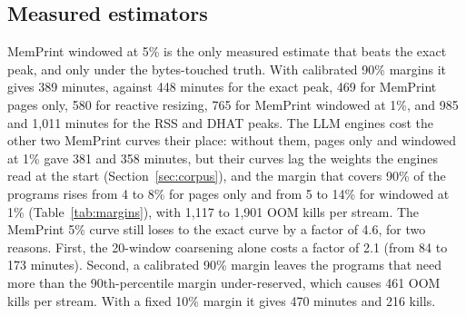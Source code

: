 \documentclass[11pt]{article}
\newcommand{\memprint}{MemPrint}
\newcommand{\secref}[1]{Section~\ref{#1}}
\newcommand{\tabref}[1]{Table~\ref{#1}}
\begin{document}
\subsection{Measured estimators}

\memprint{} windowed at 5\% is the only measured estimate that beats the exact peak, and only under the
bytes-touched truth. With calibrated 90\% margins it gives 389 minutes, against 448 minutes for the exact peak,
469 for \memprint{} pages only, 580 for reactive resizing, 765 for \memprint{} windowed at 1\%, and 985 and 1{,}011
minutes for the RSS and DHAT peaks. The LLM engines cost the other two \memprint{} curves their place: without
them, pages only and windowed at 1\% gave 381 and 358 minutes, but their curves lag the weights the engines read
at the start (\secref{sec:corpus}), and the margin that covers 90\% of the programs rises from 4 to 8\% for pages
only and from 5 to 14\% for windowed at 1\% (\tabref{tab:margins}), with 1{,}117 to 1{,}901 OOM kills per stream.
The \memprint{} 5\% curve still loses to the exact curve by a factor of 4.6, for two reasons. First, the 20-window
coarsening alone costs a factor of 2.1 (from 84 to 173 minutes). Second, a calibrated 90\% margin leaves the
programs that need more than the 90th-percentile margin under-reserved, which causes 461 OOM kills per stream.
With a fixed 10\% margin it gives 470 minutes and 216 kills.
\end{document}
